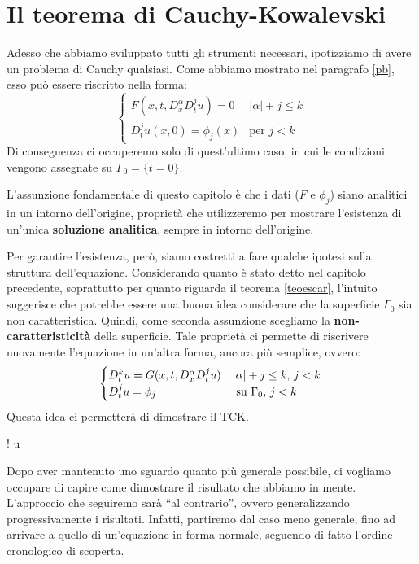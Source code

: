 \chapter{Il teorema di Cauchy-Kowalevski} \label{invariant}

Adesso che abbiamo sviluppato tutti gli strumenti necessari, ipotizziamo di avere un problema di Cauchy qualsiasi. Come abbiamo mostrato nel paragrafo \ref{pb}, esso può essere riscritto nella forma:
$$
\begin{cases}
F(x,t, D^\alpha_x D^j_t u)=0 & |\alpha | +j \leq k\\
D^j_t u (x,0)= \phi_j(x) & \text{per }j<k 
\end{cases}
$$
Di conseguenza ci occuperemo solo di quest'ultimo caso, in cui le condizioni vengono assegnate su $\Gamma_0=\{ t=0 \}$.

L'assunzione fondamentale di questo capitolo è che i dati ($F$ e $\phi_j$) siano analitici in un intorno dell'origine, proprietà che utilizzeremo per mostrare l'esistenza di un'unica \textbf{soluzione analitica}, sempre in intorno dell'origine.

Per garantire l'esistenza, però, siamo costretti a fare qualche ipotesi sulla struttura dell'equazione. 
Considerando quanto è stato detto nel capitolo precedente, soprattutto per quanto riguarda il teorema \ref{teoescar}, l'intuito suggerisce che potrebbe essere una buona idea considerare che la superficie $\Gamma_0$ sia non caratteristica. 
Quindi, come seconda assunzione scegliamo la \textbf{non-caratteristicità} della superficie. Tale proprietà ci permette di riscrivere nuovamente l'equazione in un'altra forma, ancora più semplice, ovvero:
\begin{equation}\label{pbnorm}
\begin{cases}
D_{t}^k u = G(x,t, D^\alpha_x D^j_t u) & |\alpha |+ j \leq k, \, j<k \\
D_t^ju = \phi_j & \text{ su } \Gamma_0, \, j<k
\end{cases} \\
\end{equation}
Questa idea ci permetterà di dimostrare il TCK.
\begin{namedtheorem}
{\exists ! \; u }
\end{namedtheorem}


Dopo aver mantenuto uno sguardo quanto più generale possibile, ci vogliamo occupare di capire come dimostrare il risultato che abbiamo in mente. L'approccio che seguiremo sarà ``al contrario'', ovvero generalizzando progressivamente i risultati. Infatti, partiremo dal caso meno generale, fino ad arrivare a quello di un'equazione in forma normale, seguendo di fatto l'ordine cronologico di scoperta.




